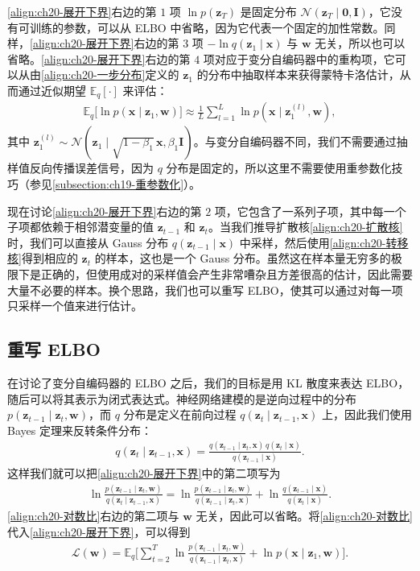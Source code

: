 \documentclass[../../main.tex]{subfiles}
\begin{document}
\eqref{align:ch20-展开下界}右边的第 $1$ 项 $\ln p(\bm{z}_T)$ 是固定分布 $\mathcal{N}(\bm{z}_T\mid\bm{0},\bm{I})$，它没有可训练的参数，可以从 ELBO 中省略，因为它代表一个固定的加性常数。同样，\eqref{align:ch20-展开下界}右边的第 $3$ 项 $-\ln q(\bm{z}_1\mid\bm{x})$ 与 $\bm{w}$ 无关，所以也可以省略。\eqref{align:ch20-展开下界}右边的第 $4$ 项对应于变分自编码器中的重构项，它可以从由\eqref{align:ch20-一步分布}定义的 $\bm{z}_1$ 的分布中抽取样本来获得蒙特卡洛估计，从而通过近似期望 $\mathbb{E}_{q}[\cdot]$ 来评估：
\begin{align}
\mathbb{E}_{q}\big[\ln p(\bm{x}\mid\bm{z}_1,\bm{w})\big]\approx\frac{1}{L}\sum_{l=1}^{L}\ln p(\bm{x}\mid\bm{z}_1^{(l)},\bm{w}),
\label{align:ch20-重构估计}
\end{align}
其中 $\bm{z}_1^{(l)}\sim\mathcal{N}(\bm{z}_1\mid\sqrt{1-\beta_1}\,\bm{x},\beta_1\bm{I})$。与变分自编码器不同，我们不需要通过抽样值反向传播误差信号，因为 $q$ 分布是固定的，所以这里不需要使用重参数化技巧（参见\cref{subsection:ch19-重参数化}）。

现在讨论\eqref{align:ch20-展开下界}右边的第 $2$ 项，它包含了一系列子项，其中每一个子项都依赖于相邻潜变量的值 $\bm{z}_{t-1}$ 和 $\bm{z}_t$。当我们推导扩散核\eqref{align:ch20-扩散核}时，我们可以直接从 Gauss 分布 $q(\bm{z}_{t-1}\mid\bm{x})$ 中采样，然后使用\eqref{align:ch20-转移核}得到相应的 $\bm{z}_t$ 的样本，这也是一个 Gauss 分布。虽然这在样本量无穷多的极限下是正确的，但使用成对的采样值会产生非常嘈杂且方差很高的估计，因此需要大量不必要的样本。换个思路，我们也可以重写 ELBO，使其可以通过对每一项只采样一个值来进行估计。

\subsection{重写 ELBO}\label{subsection:ch20-重写ELBO}

在讨论了变分自编码器的 ELBO 之后，我们的目标是用 KL 散度来表达 ELBO，随后可以将其表示为闭式表达式。神经网络建模的是逆向过程中的分布 $p(\bm{z}_{t-1}\mid\bm{z}_t,\bm{w})$，而 $q$ 分布是定义在前向过程 $q(\bm{z}_t\mid\bm{z}_{t-1},\bm{x})$ 上，因此我们使用 Bayes 定理来反转条件分布：
\begin{align}
q(\bm{z}_t\mid\bm{z}_{t-1},\bm{x})=\frac{q(\bm{z}_{t-1}\mid\bm{z}_t,\bm{x})\,q(\bm{z}_t\mid\bm{x})}{q(\bm{z}_{t-1}\mid\bm{x})}.
\label{align:ch20-反向Bayes}
\end{align}
这样我们就可以把\eqref{align:ch20-展开下界}中的第二项写为
\begin{align}
\ln\frac{p(\bm{z}_{t-1}\mid\bm{z}_t,\bm{w})}{q(\bm{z}_t\mid\bm{z}_{t-1},\bm{x})}=\ln\frac{p(\bm{z}_{t-1}\mid\bm{z}_t,\bm{w})}{q(\bm{z}_{t-1}\mid\bm{z}_t,\bm{x})}+\ln\frac{q(\bm{z}_{t-1}\mid\bm{x})}{q(\bm{z}_t\mid\bm{x})}.
\label{align:ch20-对数比}
\end{align}
\eqref{align:ch20-对数比}右边的第二项与 $\bm{w}$ 无关，因此可以省略。将\eqref{align:ch20-对数比}代入\eqref{align:ch20-展开下界}，可以得到
\begin{align}
\mathcal{L}(\bm{w})=\mathbb{E}_{q}\Big[\sum_{t=2}^{T}\ln\frac{p(\bm{z}_{t-1}\mid\bm{z}_t,\bm{w})}{q(\bm{z}_{t-1}\mid\bm{z}_t,\bm{x})}+\ln p(\bm{x}\mid\bm{z}_1,\bm{w})\Big].
\label{align:ch20-中间下界}
\end{align}
\end{document}
